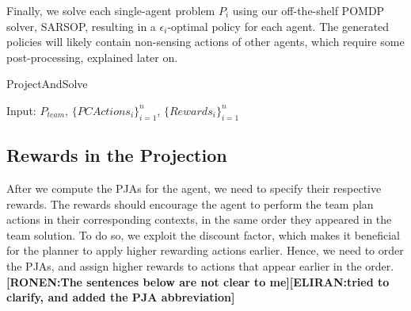 \documentclass[letterpaper]{article} %
\newcommand{\eliran}[1]{\textbf{[\color{red}ELIRAN:#1]}}
\newcommand{\ronen}[1]{\textbf{[\color{blue}RONEN:#1]}}
\begin{document}
Finally, we solve each single-agent problem $P_i$ using our off-the-shelf POMDP solver, SARSOP, resulting in a $\epsilon_i$-optimal policy for each agent. The generated policies will likely
contain non-sensing actions of other agents, which require
some post-processing, explained later on.

\begin{algorithm}
\caption{ProjectAndSolve}
\begin{algorithmic}[tbph]
\State Input: $P_{team}$, ${\{PCActions_i\}}_{i=1}^{n}$, ${\{Rewards_i\}}_{i=1}^{n}$
\EndFor
{}
\end{algorithmic}
\end{algorithm}


\subsection{Rewards in the Projection}

After we compute the PJAs for the agent, we need to specify their respective rewards. The rewards should encourage the agent to perform the team plan actions in their corresponding contexts, in the same order they appeared in the team solution. 
To do so, we exploit the discount factor, which makes it beneficial for the planner to apply higher rewarding actions earlier. Hence, we need to order the PJAs, and assign higher rewards to actions that appear earlier in the order.
\ronen{The sentences below are not clear to me}\eliran{tried to clarify, and added the PJA abbreviation} 
\end{document}
